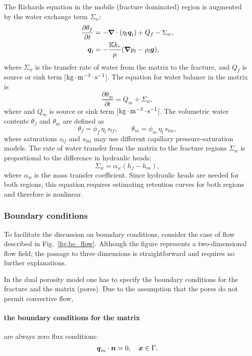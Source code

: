 The Richards equation in the mobile (fracture dominated) region is augmented by the water exchange
term $\Sigma_w$: 
\begin{subequations}
\begin{align}
  \frac{\partial \theta_f}{\partial t} 
  &= 
  -{\boldsymbol{\nabla}} \cdot (\eta_l {\boldsymbol{q}}_l) + Q_f - \Sigma_w, 
  \\
  {\boldsymbol{q}}_l 
  &= 
  -\frac{{\mathbb K} k_r}{\mu} ({\boldsymbol{\nabla}} p_l - \rho_l {\boldsymbol{g}}),
\end{align}
\end{subequations}
where $\Sigma_w$ is the transfer rate of water from the matrix to the fracture, 
and $Q_f$ is source or sink term [${\rm kg} {\,\cdot\,} {\rm m}^{-3} {\,\cdot\,} {\rm s}^{-1}$].
The equation for water balance in the matrix is
$$
  \frac{\partial \theta_m}{\partial t} 
  = Q_m + \Sigma_w,
$$
where and $Q_m$ is source or sink term [${\rm kg} {\,\cdot\,} {\rm m}^{-3} {\,\cdot\,} {\rm s}^{-1}$].
The volumetric water contents $\theta_f$ and $\theta_m$ are defined as
$$
  \theta_f = \phi_f\, \eta_l\, s_{lf},\qquad
  \theta_m = \phi_m\, \eta_l\, s_{lm},
$$
where saturations $s_{lf}$ and $s_{lm}$ may use different 
capillary pressure-saturation models.
The rate of water transfer from the matrix to the fracture regions $\Sigma_w$ 
is proportional to the difference in hydraulic heads:
$$
  \Sigma_w = \alpha_w (h_f - h_m),
$$
where $\alpha_w$ is the mass transfer coefficient.
Since hydraulic heads are needed for both regions, this equation requires
estimating retention curves for both regions and therefore is nonlinear.


\subsubsection{Boundary conditions}
\label{sec:flow-boundary-conditions}


To facilitate the discussion on boundary conditions, consider the case of 
flow described in Fig.~\ref{fig:bc_flow}. 
Although the figure represents a two-dimensional flow field, the passage to three dimensions 
is straightforward and requires no further explanations. 

In the dual porosity model one has to specify the boundary conditions for the fracture and the matrix (pores).
Due to the assumption that the pores do not permit convective flow,
\paragraph{the boundary conditions for the matrix} are always zero flux conditions:
\begin{equation}
\label{eq:BC flux DP matrix}
  {\boldsymbol{q}}_m\cdot \boldsymbol{n} = 0, \quad {\boldsymbol{x}} \in \Gamma.
\end{equation}




